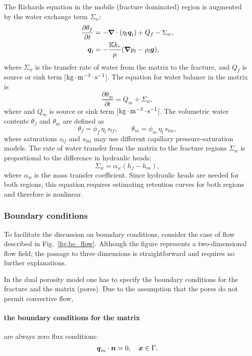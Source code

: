 The Richards equation in the mobile (fracture dominated) region is augmented by the water exchange
term $\Sigma_w$: 
\begin{subequations}
\begin{align}
  \frac{\partial \theta_f}{\partial t} 
  &= 
  -{\boldsymbol{\nabla}} \cdot (\eta_l {\boldsymbol{q}}_l) + Q_f - \Sigma_w, 
  \\
  {\boldsymbol{q}}_l 
  &= 
  -\frac{{\mathbb K} k_r}{\mu} ({\boldsymbol{\nabla}} p_l - \rho_l {\boldsymbol{g}}),
\end{align}
\end{subequations}
where $\Sigma_w$ is the transfer rate of water from the matrix to the fracture, 
and $Q_f$ is source or sink term [${\rm kg} {\,\cdot\,} {\rm m}^{-3} {\,\cdot\,} {\rm s}^{-1}$].
The equation for water balance in the matrix is
$$
  \frac{\partial \theta_m}{\partial t} 
  = Q_m + \Sigma_w,
$$
where and $Q_m$ is source or sink term [${\rm kg} {\,\cdot\,} {\rm m}^{-3} {\,\cdot\,} {\rm s}^{-1}$].
The volumetric water contents $\theta_f$ and $\theta_m$ are defined as
$$
  \theta_f = \phi_f\, \eta_l\, s_{lf},\qquad
  \theta_m = \phi_m\, \eta_l\, s_{lm},
$$
where saturations $s_{lf}$ and $s_{lm}$ may use different 
capillary pressure-saturation models.
The rate of water transfer from the matrix to the fracture regions $\Sigma_w$ 
is proportional to the difference in hydraulic heads:
$$
  \Sigma_w = \alpha_w (h_f - h_m),
$$
where $\alpha_w$ is the mass transfer coefficient.
Since hydraulic heads are needed for both regions, this equation requires
estimating retention curves for both regions and therefore is nonlinear.


\subsubsection{Boundary conditions}
\label{sec:flow-boundary-conditions}


To facilitate the discussion on boundary conditions, consider the case of 
flow described in Fig.~\ref{fig:bc_flow}. 
Although the figure represents a two-dimensional flow field, the passage to three dimensions 
is straightforward and requires no further explanations. 

In the dual porosity model one has to specify the boundary conditions for the fracture and the matrix (pores).
Due to the assumption that the pores do not permit convective flow,
\paragraph{the boundary conditions for the matrix} are always zero flux conditions:
\begin{equation}
\label{eq:BC flux DP matrix}
  {\boldsymbol{q}}_m\cdot \boldsymbol{n} = 0, \quad {\boldsymbol{x}} \in \Gamma.
\end{equation}




